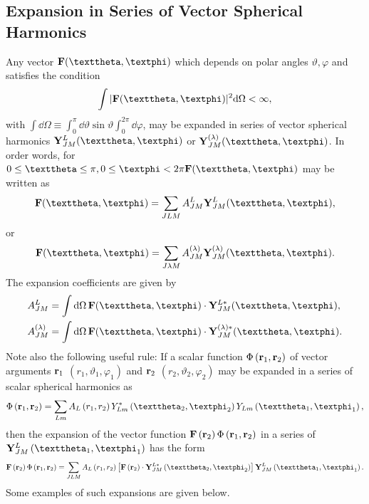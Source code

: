 \subsection{Expansion in Series of Vector Spherical Harmonics}\label{sec:7.3.14}
Any vector $\vect{F}(\vartheta, \varphi)$ which depends on polar angles $\vartheta, \varphi$ and satisfies the condition
\begin{equation}
\int|\vect{F}(\vartheta, \varphi)|^{2} \dd \Omega<\infty, \label{eq:7:3:125}
\end{equation}
with $\int \dd \Omega \equiv \int_{0}^{\pi} \dd \vartheta \sin \vartheta \int_{0}^{2 \pi} \dd \varphi$, may be expanded in series of vector spherical harmonics $\vect{Y}_{J M}^{L}(\vartheta, \varphi)$ or $\vect{Y}_{J M}^{(\lambda)}(\vartheta, \varphi)$. In order words, for $0 \leq \vartheta \leq \pi, 0 \leq \varphi<2 \pi \vect{F}(\vartheta, \varphi)$ may be written as
\begin{equation}
\vect{F}(\vartheta, \varphi)=\sum_{J L M} A_{J M}^{L} \vect{Y}_{J M}^{L}(\vartheta, \varphi), \label{eq:7:3:126}
\end{equation}
or
\begin{equation}
\vect{F}(\vartheta, \varphi)=\sum_{J \lambda M} A_{J M}^{(\lambda)} \vect{Y}_{J M}^{(\lambda)}(\vartheta, \varphi) . \label{eq:7:3:127}
\end{equation}
The expansion coefficients are given by
\begin{align}
& A_{J M}^{L}=\int \dd \Omega \,\vect{F}(\vartheta, \varphi) \cdot \vect{Y}_{J M}^{L *}(\vartheta, \varphi), \notag\\
& A_{J M}^{(\lambda)}=\int \dd \Omega \,\vect{F}(\vartheta, \varphi) \cdot \vect{Y}_{J M}^{(\lambda) *}(\vartheta, \varphi) . \label{eq:7:3:128}
\end{align}
Note also the following useful rule: If a scalar function $\Phi\left(\mathbf{r}_{1}, \mathbf{r}_{2}\right)$ of vector arguments $\mathbf{r}_{1}$ $\left(r_{1}, \vartheta_{1}, \varphi_{1}\right)$ and $\mathbf{r}_{2}$ $\left(r_{2}, \vartheta_{2}, \varphi_{2}\right)$ may be expanded in a series of scalar spherical harmonics as
\begin{equation}
\Phi\left(\vect{r}_{1}, \vect{r}_{2}\right)=\sum_{L m} A_{L}\left(r_{1}, r_{2}\right) Y_{L m}^{*}\left(\vartheta_{2}, \varphi_{2}\right) Y_{L m}\left(\vartheta_{1}, \varphi_{1}\right), \label{eq:7:3:129}
\end{equation}
then the expansion of the vector function $\mathbf{F}\left(\mathbf{r}_{2}\right) \Phi\left(\mathbf{r}_{1}, \mathbf{r}_{2}\right)$ in a series of $\vect{Y}_{J M}^{L}\left(\vartheta_{1}, \varphi_{1}\right)$ has the form
\begin{equation}
\vect{F}\left(\vect{r}_{2}\right) \Phi\left(\vect{r}_{1}, \vect{r}_{2}\right)=\sum_{J L M} A_{L}\left(r_{1}, r_{2}\right)\left[\vect{F}\left(\vect{r}_{2}\right) \cdot \vect{Y}_{J M}^{L *}\left(\vartheta_{2}, \varphi_{2}\right)\right] \vect{Y}_{J M}^{L}\left(\vartheta_{1}, \varphi_{1}\right). \label{eq:7:3:130}
\end{equation}
Some examples of such expansions are given below.\\
